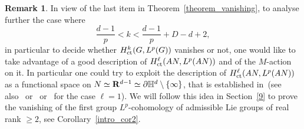 \documentclass[11pt]{article}
\theoremstyle{definition}
\newtheorem{rema}[theo]{Remark}
\numberwithin{equation}{section}
\numberwithin{figure}{section}
\numberwithin{table}{section}
\DeclareMathOperator{\ct}{ct}
\begin{document}
\begin{rema}\label{remark_SL}
In view of the last item in Theorem~\ref{theorem_vanishing}, to analyse further the case where 
\[
\frac{d-1}{p} <k< \frac{d-1}{p} + D-d+2,
\]
in particular to decide whether ${\rm H}^k _{\ct} (G, L^p(G))$ vanishes or not, one would like to take advantage of a good description of ${\rm H}^\ell _{\ct} (AN, L^p(AN))$ and of the $M$-action on it. In particular one could try to exploit the description of ${\rm H}^\ell _{\ct} (AN, L^p(AN))$ as a functional space on $N \simeq {\bf R}^{d-1} \simeq \partial \mathbb H ^d \setminus \{\infty \}$, that is established in~\cite[Section~8.2]{Pa99}\linebreak(see also~\cite{Pa1} or~\cite{Rez} or~\cite{BP2} for the case $\ell =1$). We will follow this idea in Section~\ref{9} to prove the vanishing of the first group $L^p$-cohomology of admissible Lie groups of real rank $\geqslant 2$, see Corollary~\ref{intro_cor2}.
\end{rema}
\end{document}
